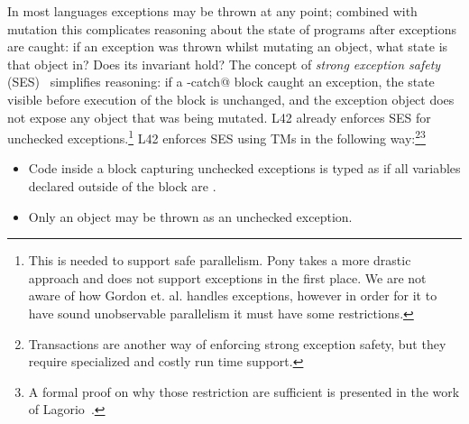 {}\label{s:exceptions}
In most languages exceptions may be thrown at any point; combined with mutation this complicates reasoning about the state of programs after exceptions are caught: if an exception was thrown whilst mutating an object, what state is that object in? Does its invariant hold?
The concept of \emph{strong exception safety} (SES)~\cite{Abrahams2000,JOT:issue_2011_01/article1} simplifies reasoning:
if a \Q@try-catch@ block caught an exception, the state visible before execution of the \Q@try@ block is unchanged, and the exception object does not expose any object that was being mutated.
L42 already enforces SES for unchecked exceptions.\footnote{
This is needed to support safe parallelism. Pony takes a more drastic approach and does not support exceptions in the first place. 
We are not aware of how Gordon et. al. handles exceptions, however in order for it to have sound unobservable parallelism it must have some restrictions.
}
L42 enforces SES using TMs in the following way:\footnote{Transactions are another way of enforcing strong exception safety, but they require specialized and costly run time support.}\footnote{A formal proof on why those restriction are sufficient is presented in the work of Lagorio~\cite{JOT:issue_2011_01/article1}.}
\begin{itemize}
\item Code inside a \Q@try@ block capturing unchecked exceptions is typed as if all \Q@mut@ variables declared outside of the block are \Q@read@.
\item Only an \Q@imm@ object may be thrown as an unchecked exception.
\end{itemize} 

